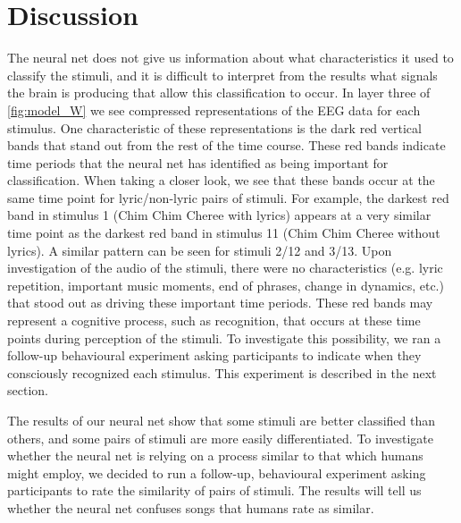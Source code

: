 \section{Discussion}
The neural net does not give us information about what characteristics it used to classify the stimuli, and it is difficult to interpret from the results what signals the brain is producing that allow this classification to occur. 
In layer three of \autoref{fig:model_W} we see compressed representations of the EEG data for each stimulus. 
One characteristic of these representations is the dark red vertical bands that stand out from the rest of the time course. 
These red bands indicate time periods that the neural net has identified as being important for classification. 
When taking a closer look, we see that these bands occur at the same time point for lyric/non-lyric pairs of stimuli. 
For example, the darkest red band in stimulus 1 (Chim Chim Cheree with lyrics) appears at a very similar time point as the darkest red band in stimulus 11 (Chim Chim Cheree without lyrics).
A similar pattern can be seen for stimuli 2/12 and 3/13.
Upon investigation of the audio of the stimuli, there were no characteristics (e.g. lyric repetition, important music moments, end of phrases, change in dynamics, etc.) that stood out as driving these important time periods.
These red bands may represent a cognitive process, such as recognition, that occurs at these time points during perception of the stimuli. 
To investigate this possibility, we ran a follow-up behavioural experiment asking participants to indicate when they consciously recognized each stimulus. 
This experiment is described in the next section.

The results of our neural net show that some stimuli are better classified than others, and some pairs of stimuli are more easily differentiated. 
To investigate whether the neural net is relying on a process similar to that which humans might employ, we decided to run a follow-up, behavioural experiment asking participants to rate the similarity of pairs of stimuli. 
The results will tell us whether the neural net confuses songs that humans rate as similar. 